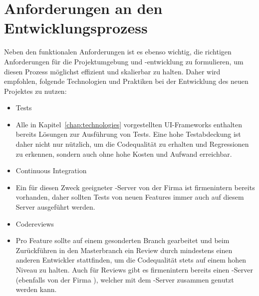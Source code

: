 \section{Anforderungen an den Entwicklungsprozess}
Neben den funktionalen Anforderungen ist es ebenso wichtig, die richtigen Anforderungen für die Projektumgebung und -entwicklung zu formulieren, um diesen Prozess möglichst effizient und skalierbar zu halten. Daher wird empfohlen, folgende Technologien und Praktiken bei der Entwicklung des neuen Projektes zu nutzen:

\begin{itemize}
    \item{Tests}
    \item[] Alle in Kapitel~\ref{chap:technologies} vorgestellten UI-Frameworks enthalten bereits Lösungen zur Ausführung von Tests. Eine hohe Testabdeckung ist daher nicht nur nützlich, um die Codequalität zu erhalten und Regressionen zu erkennen, sondern auch ohne hohe Kosten und Aufwand erreichbar.
    \item{Continuous Integration}
    \item[] Ein für diesen Zweck geeigneter -Server von der Firma  ist firmenintern bereits vorhanden, daher sollten Tests von neuen Features immer auch auf diesem Server ausgeführt werden.
    \item{Codereviews}
    \item[] Pro Feature sollte auf einem gesonderten Branch gearbeitet und beim Zurückführen in den Masterbranch ein Review durch mindestens einen anderen Entwickler stattfinden, um die Codequalität stets auf einem hohen Niveau zu halten. Auch für Reviews gibt es firmenintern bereits einen -Server (ebenfalls von der Firma ), welcher mit dem -Server zusammen genutzt werden kann.
\end{itemize}

